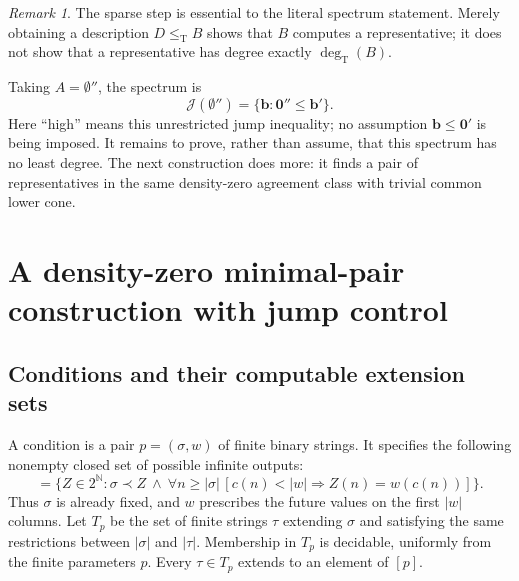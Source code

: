 \documentclass[11pt,a4paper]{article}
\newcommand{\N}{\mathbb N}
\newcommand{\Cantor}{2^{\N}}
\newcommand{\leT}{\leq_{\mathrm T}}
\newcommand{\degT}{\operatorname{deg}_{\mathrm T}}
\newcommand{\J}{\mathcal J}
\newcommand{\zero}{\mathbf 0}
\theoremstyle{definition}\newtheorem{definition}[theorem]{Definition}
\theoremstyle{remark}\newtheorem{remark}[theorem]{Remark}
\begin{document}
\begin{remark}
The sparse step is essential to the literal spectrum statement. Merely obtaining a description $D\leT B$ shows that $B$ computes a representative; it does not show that a representative has degree exactly $\degT(B)$.
\end{remark}

Taking $A=\emptyset''$, the spectrum is
\begin{equation}
 \J(\emptyset'')=\{\mathbf b:\zero''\leq\mathbf b'\}.
 \label{eq:high}
\end{equation}
Here ``high'' means this unrestricted jump inequality; no assumption $\mathbf b\leq\zero'$ is being imposed. It remains to prove, rather than assume, that this spectrum has no least degree. The next construction does more: it finds a pair of representatives in the same density-zero agreement class with trivial common lower cone.

\section{A density-zero minimal-pair construction with jump control}
\label{sec:construction}
\subsection{Conditions and their computable extension sets}
A condition is a pair $p=(\sigma,w)$ of finite binary strings. It specifies the following nonempty closed set of possible infinite outputs:
\begin{equation}
 [p]=\{Z\in\Cantor:\sigma\prec Z\ \land\
 \forall n\geq|\sigma|\,[c(n)<|w|\Rightarrow Z(n)=w(c(n))]\}.
 \label{eq:condition}
\end{equation}
Thus $\sigma$ is already fixed, and $w$ prescribes the future values on the first $|w|$ columns. Let $T_p$ be the set of finite strings $\tau$ extending $\sigma$ and satisfying the same restrictions between $|\sigma|$ and $|\tau|$. Membership in $T_p$ is decidable, uniformly from the finite parameters $p$. Every $\tau\in T_p$ extends to an element of $[p]$.
\end{document}
